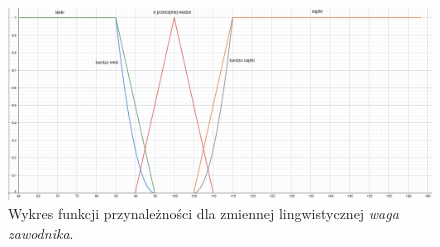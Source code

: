 \documentclass{classrep}
\begin{document}
\begin{enumerate}
\begin{figure}[H]
        \centering
        \includegraphics[width=14cm]{wykres_waga.png}
        \caption{Wykres funkcji przynależności dla zmiennej lingwistycznej \textit{waga zawodnika}.}
        \label{rysunek:waga}
    \end{figure}
    

\end{enumerate}
\end{document}
